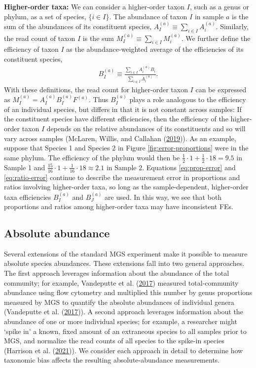 \documentclass[
]{article}
\begin{document}
\textbf{Higher-order taxa:}
We can consider a higher-order taxon \(I\), such as a genus or phylum, as a set of species, \(\{i \in I\}\).
The abundance of taxon \(I\) in sample \(a\) is the sum of the abundances of its constituent species, \(A_{I}^{(a)} \equiv \sum_{i \in I} A_{i}^{(a)}\).
Similarly, the read count of taxon \(I\) is the sum \(M_{I}^{(a)} \equiv \sum_{i \in I} M_{i}^{(a)}\).
We further define the efficiency of taxon \(I\) as the abundance-weighted average of the efficiencies of its constituent species,
\begin{align}
  \label{eq:efficiency-general}
  B_I^{(a)} \equiv \frac{\sum_{i\in I} A_{i}^{(a)} B_{i}}{\sum_{i\in I} A_{i}^{(a)}}.
\end{align}
With these definitions, the read count for higher-order taxon \(I\) can be expressed as
\(M_{I}^{(a)} = A_{I}^{(a)} B_I^{(a)} F^{(a)}\).
Thus \(B_I^{(a)}\) plays a role analogous to the efficiency of an individual species, but differs in that it is not constant across samples:
If the constituent species have different efficiencies, then the efficiency of the higher-order taxon \(I\) depends on the relative abundances of its constituents and so will vary across samples (McLaren, Willis, and Callahan (\protect\hyperlink{ref-mclaren2019cons}{2019})).
As an example, suppose that Species 1 and Species 2 in Figure \ref{fig:error-proportions} were in the same phylum.
The efficiency of the phylum would then be \(\tfrac{1}{2} \cdot 1 + \tfrac{1}{2} \cdot 18 = 9.5\) in Sample 1 and \(\tfrac{15}{16} \cdot 1 + \tfrac{1}{16} \cdot 18 \approx 2.1\) in Sample 2.
Equations \eqref{eq:prop-error} and \eqref{eq:ratio-error} continue to describe the measurement error in proportions and ratios involving higher-order taxa, so long as the sample-dependent, higher-order taxa efficiencies \(B_I^{(a)}\) and \(B_J^{(a)}\) are used.
In this way, we see that both proportions and ratios among higher-order taxa may have inconsistent FEs.

\hypertarget{absolute-abundance}{%
\subsection{Absolute abundance}\label{absolute-abundance}}

Several extensions of the standard MGS experiment make it possible to measure absolute species abundances.
These extensions fall into two general approaches.
The first approach leverages information about the abundance of the total community; for example, Vandeputte et al. (\protect\hyperlink{ref-vandeputte2017quan}{2017}) measured total-community abundance using flow cytometry and multiplied this number by genus proportions measured by MGS to quantify the absolute abundances of individual genera (Vandeputte et al. (\protect\hyperlink{ref-vandeputte2017quan}{2017})).
A second approach leverages information about the abundance of one or more individual species; for example, a researcher might `spike in' a known, fixed amount of an extraneous species to all samples prior to MGS, and normalize the read counts of all species to the spike-in species (Harrison et al. (\protect\hyperlink{ref-harrison2021theq}{2021})).
We consider each approach in detail to determine how taxonomic bias affects the resulting absolute-abundance measurements.
\end{document}
